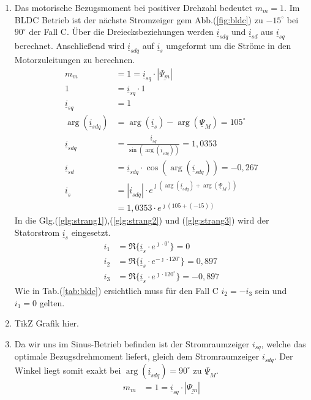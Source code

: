 \begin{solution}
\begin{enumerate}
\item Das motorische Bezugsmoment bei positiver Drehzahl bedeutet $m_m = 1$. Im BLDC Betrieb ist der nächste Stromzeiger gem Abb.(\ref{fig:bldc}) zu $-15^\circ$ bei $90^\circ$ der Fall C. Über die Dreiecksbeziehungen werden $\underline{i}_{sdq}$ und $\underline{i}_{sd}$ aus $\underline{i}_{sq}$ berechnet. Anschließend wird $\underline{i}_{sdq}$ auf $\underline{i}_{s}$ umgeformt um die Ströme in den Motorzuleitungen zu berechnen.
\begin{align}
m_m &= 1 = \underline{i}_{sq} \cdot |\underline{\Psi_m}|\\
1 &= \underline{i}_{sq} \cdot 1\\
\underline{i}_{sq} &= 1\\
\arg(\underline{i}_{sdq}) &= \arg(\underline{i}_{s}) -\arg(\underline{\Psi}_{M})=105^\circ\\
\underline{i}_{sdq} &= \frac{\underline{i}_{sq}}{\sin(\arg(\underline{i}_{sdq}))}= 1,0353\\
\underline{i}_{sd} &= \underline{i}_{sdq} \cdot \cos(\arg(\underline{i}_{sdq})) = -0,267\\
\underline{i}_{s} &= |\underline{i}_{sdq}| \cdot e^{\jmath (\arg(\underline{i}_{sdq}) + \arg(\underline{\Psi}_{M}))}\\&= 1,0353 \cdot e^{\jmath ( 105 + (-15))}
\end{align}
In die Glg.(\ref{glg:strang1}),(\ref{glg:strang2}) und (\ref{glg:strang3}) wird der Statorstrom $\underline{i}_s$ eingesetzt.
\begin{align}
i_1 & = \Re \{ \underline{i}_s \cdot e^{\jmath \cdot 0 ^\circ} \} = 0\\
i_2 & = \Re \{ \underline{i}_s \cdot e^{-\jmath \cdot 120 ^\circ} \} = 0,897 \\
i_3 & = \Re \{ \underline{i}_s \cdot e^{\jmath \cdot 120 ^\circ} \}=  -0,897
\end{align}
Wie in Tab.(\ref{tab:bldc}) ersichtlich muss für den Fall C $i_2= -i_3$ sein und $i_1= 0$ gelten.
\item TikZ Grafik hier.
\item	Da wir uns im Sinus-Betrieb befinden ist der Stromraumzeiger $i_{sq}$, welche das optimale Bezugsdrehmoment liefert, gleich dem Stromraumzeiger $i_{sdq}$. Der Winkel liegt somit exakt bei $\arg(\underline{i}_{sdq})=90^\circ$ zu $\underline{\Psi}_M$.
\begin{align}
m_m &= 1 = \underline{i}_{sq} \cdot |\underline{\Psi_m}|\\

\end{align}
\end{enumerate}
\end{solution}
